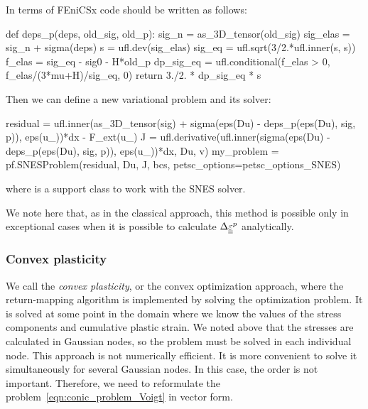\documentclass[12pt]{article}
\begin{document}
In terms of FEniCSx code should be written as follows:
\begin{pythoncode}
    def deps_p(deps, old_sig, old_p):
        sig_n = as_3D_tensor(old_sig)
        sig_elas = sig_n + sigma(deps)
        s = ufl.dev(sig_elas)
        sig_eq = ufl.sqrt(3/2.*ufl.inner(s, s))
        f_elas = sig_eq - sig0 - H*old_p
        dp_sig_eq = ufl.conditional(f_elas > 0, f_elas/(3*mu+H)/sig_eq, 0) 
        return 3./2. * dp_sig_eq * s 
\end{pythoncode}
Then we can define a new variational problem and its solver:
\begin{pythoncode}
    residual = ufl.inner(as_3D_tensor(sig) + sigma(eps(Du) - deps_p(eps(Du), sig, p)), eps(u_))*dx - F_ext(u_)
    J = ufl.derivative(ufl.inner(sigma(eps(Du) - deps_p(eps(Du), sig, p)), eps(u_))*dx, Du, v)
    my_problem = pf.SNESProblem(residual, Du, J, bcs, petsc_options=petsc_options_SNES)
\end{pythoncode}
where  is a support class to work with the SNES solver.

We note here that, as in the classical approach, this method is possible only in exceptional cases when it is possible to calculate $\Delta\underline{\underline{\varepsilon}}^p$ analytically.

\subsubsection{Convex plasticity}
\label{sec:development:convex_plasticity}

We call the \textit{convex plasticity}, or the convex optimization approach, where the return-mapping algorithm is implemented by solving the optimization problem. It is solved at some point in the domain where we know the values of the stress components and cumulative plastic strain. We noted above that the stresses are calculated in Gaussian nodes, so the problem must be solved in each individual node. This approach is not numerically efficient. It is more convenient to solve it simultaneously for several Gaussian nodes. In this case, the order is not important. Therefore, we need to reformulate the problem~\eqref{eqn:conic_problem_Voigt} in vector form. 
\end{document}
